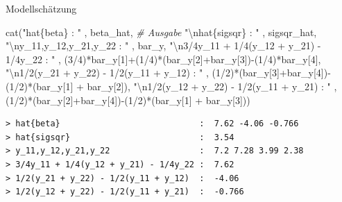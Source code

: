 \documentclass[
  8pt,
  ignorenonframetext,
]{beamer}
\newenvironment{Shaded}{\begin{snugshade}}{\end{snugshade}}
\newcommand{\CommentTok}[1]{\textcolor[rgb]{0.56,0.35,0.01}{\textit{#1}}}
\newcommand{\DecValTok}[1]{\textcolor[rgb]{0.00,0.00,0.81}{#1}}
\newcommand{\FunctionTok}[1]{\textcolor[rgb]{0.00,0.00,0.00}{#1}}
\newcommand{\NormalTok}[1]{#1}
\newcommand{\SpecialCharTok}[1]{\textcolor[rgb]{0.00,0.00,0.00}{#1}}
\newcommand{\StringTok}[1]{\textcolor[rgb]{0.31,0.60,0.02}{#1}}
\begin{document}
\begin{frame}[fragile]{Modellschätzung}
\begin{Shaded}
\begin{Highlighting}[]
\FunctionTok{cat}\NormalTok{(}\StringTok{"hat\{beta\}                            : "}\NormalTok{   , beta\_hat,  }\CommentTok{\# Ausgabe}
    \StringTok{"}\SpecialCharTok{\textbackslash{}n}\StringTok{hat\{sigsqr\}                          : "}\NormalTok{ , sigsqr\_hat,}
    \StringTok{"}\SpecialCharTok{\textbackslash{}n}\StringTok{y\_11,y\_12,y\_21,y\_22                  : "}\NormalTok{ , bar\_y,}
    \StringTok{"}\SpecialCharTok{\textbackslash{}n}\StringTok{3/4y\_11 + 1/4(y\_12 + y\_21) {-} 1/4y\_22 : "}\NormalTok{ , (}\DecValTok{3}\SpecialCharTok{/}\DecValTok{4}\NormalTok{)}\SpecialCharTok{*}\NormalTok{bar\_y[}\DecValTok{1}\NormalTok{]}\SpecialCharTok{+}\NormalTok{(}\DecValTok{1}\SpecialCharTok{/}\DecValTok{4}\NormalTok{)}\SpecialCharTok{*}\NormalTok{(bar\_y[}\DecValTok{2}\NormalTok{]}\SpecialCharTok{+}\NormalTok{bar\_y[}\DecValTok{3}\NormalTok{])}\SpecialCharTok{{-}}\NormalTok{(}\DecValTok{1}\SpecialCharTok{/}\DecValTok{4}\NormalTok{)}\SpecialCharTok{*}\NormalTok{bar\_y[}\DecValTok{4}\NormalTok{],}
    \StringTok{"}\SpecialCharTok{\textbackslash{}n}\StringTok{1/2(y\_21 + y\_22) {-} 1/2(y\_11 + y\_12)  : "}\NormalTok{ , (}\DecValTok{1}\SpecialCharTok{/}\DecValTok{2}\NormalTok{)}\SpecialCharTok{*}\NormalTok{(bar\_y[}\DecValTok{3}\NormalTok{]}\SpecialCharTok{+}\NormalTok{bar\_y[}\DecValTok{4}\NormalTok{])}\SpecialCharTok{{-}}\NormalTok{(}\DecValTok{1}\SpecialCharTok{/}\DecValTok{2}\NormalTok{)}\SpecialCharTok{*}\NormalTok{(bar\_y[}\DecValTok{1}\NormalTok{] }\SpecialCharTok{+}\NormalTok{ bar\_y[}\DecValTok{2}\NormalTok{]),}
    \StringTok{"}\SpecialCharTok{\textbackslash{}n}\StringTok{1/2(y\_12 + y\_22) {-} 1/2(y\_11 + y\_21)  : "}\NormalTok{ , (}\DecValTok{1}\SpecialCharTok{/}\DecValTok{2}\NormalTok{)}\SpecialCharTok{*}\NormalTok{(bar\_y[}\DecValTok{2}\NormalTok{]}\SpecialCharTok{+}\NormalTok{bar\_y[}\DecValTok{4}\NormalTok{])}\SpecialCharTok{{-}}\NormalTok{(}\DecValTok{1}\SpecialCharTok{/}\DecValTok{2}\NormalTok{)}\SpecialCharTok{*}\NormalTok{(bar\_y[}\DecValTok{1}\NormalTok{] }\SpecialCharTok{+}\NormalTok{ bar\_y[}\DecValTok{3}\NormalTok{]))}
\end{Highlighting}
\end{Shaded}

\begin{verbatim}
> hat{beta}                            :  7.62 -4.06 -0.766 
> hat{sigsqr}                          :  3.54 
> y_11,y_12,y_21,y_22                  :  7.2 7.28 3.99 2.38 
> 3/4y_11 + 1/4(y_12 + y_21) - 1/4y_22 :  7.62 
> 1/2(y_21 + y_22) - 1/2(y_11 + y_12)  :  -4.06 
> 1/2(y_12 + y_22) - 1/2(y_11 + y_21)  :  -0.766
\end{verbatim}
\end{frame}
\end{document}
